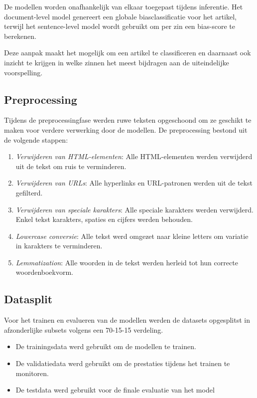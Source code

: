 De modellen worden onafhankelijk van elkaar toegepast tijdens inferentie. Het document-level model genereert een globale biasclassificatie voor het artikel, terwijl het sentence-level model wordt gebruikt om per zin een bias-score te berekenen.

Deze aanpak maakt het mogelijk om een artikel te classificeren en daarnaast ook inzicht te krijgen in welke zinnen het meest bijdragen aan de uiteindelijke voorspelling. 

\subsection{Preprocessing}

Tijdens de preprocessingfase werden ruwe teksten opgeschoond om ze geschikt te maken voor verdere verwerking door de modellen. De preprocessing bestond uit de volgende stappen:

\begin{enumerate}
    \item \textit{Verwijderen van HTML-elementen}: Alle HTML-elementen werden verwijderd uit de tekst om ruis te verminderen.
    \item \textit{Verwijderen van URLs}: Alle hyperlinks en URL-patronen werden uit de tekst gefilterd.
    \item \textit{Verwijderen van speciale karakters}: Alle speciale karakters werden verwijderd. Enkel tekst karakters, spaties en cijfers werden behouden.
    \item \textit{Lowercase conversie}: Alle tekst werd omgezet naar kleine letters om variatie in karakters te verminderen.
    \item \textit{Lemmatization}: Alle woorden in de tekst werden herleid tot hun correcte woordenboekvorm.
\end{enumerate}

\subsection{Datasplit}

Voor het trainen en evalueren van de modellen werden de datasets opgesplitst in afzonderlijke subsets volgens een 70-15-15 verdeling.

\begin{itemize}
    \item De trainingsdata werd gebruikt om de modellen te trainen.
    \item De validatiedata werd gebruikt om de prestaties tijdens het trainen te monitoren.
    \item De testdata werd gebruikt voor de finale evaluatie van het model
\end{itemize}

